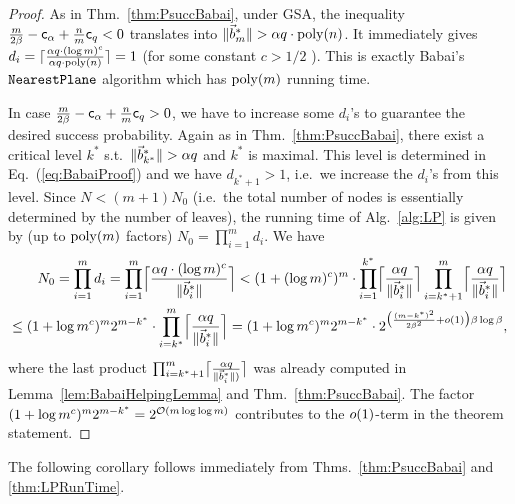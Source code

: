 \begin{proof}
	As in Thm.~\ref{thm:PsuccBabai}, under GSA, the inequality $\frac{m}{2 \beta} - \mathsf{c}_{\alpha} + \frac{n}{m}\mathsf{c}_q  < 0$ translates into $\| \vec b^*_m \| > \alpha q \cdot \mathrm{poly}(n)$. It immediately gives $d_i = \lceil \frac{\alpha q \cdot (\log m)^{c}}{ \alpha q \cdot \mathrm{poly}(n)} \rceil = 1$ (for some constant $c>1/2$ ). This is exactly Babai's $\texttt{NearestPlane}$ algorithm which has $\mathrm{poly}(m)$ running time.
	
	In case $\frac{m}{2 \beta} - \mathsf{c}_{\alpha} + \frac{n}{m}\mathsf{c}_q  > 0$, we have to increase some $d_i$'s to guarantee the desired success probability. Again as in Thm.~\ref{thm:PsuccBabai}, there exist a critical level $k^*$ s.t.\ $\| \vec b^*_{k^*}\| > \alpha q$ and $k^*$ is maximal. This level is determined in Eq.~(\ref{eq:BabaiProof}) and we have $d_{k^{*}+1}>1$, i.e.\ we increase the $d_i$'s from this level. Since $N < (m+1) N_0$ (i.e.\ the total number of nodes is essentially determined by the number of leaves), the running time of Alg.~\ref{alg:LP} is given by (up to $\mathrm{poly}(m)$ factors) $N_0 = \prod_{i=1}^m d_i$. We have
	\begin{align*}
		N_0 = \prod_{i=1}^m d_i = 
		\prod_{i=1}^m \Bigl\lceil \frac{\alpha q \cdot (\log m)^{c}}{ \| \vec b^*_i \|} \Bigr\rceil < 
		(1+(\log m)^c)^m \cdot \prod_{i=1}^{k^*} \Bigl\lceil \frac{\alpha q}{ \| \vec b^*_i \|} \Bigr\rceil \prod_{i=k^*+1}^{m} \Bigl\lceil \frac{\alpha q}{ \| \vec b^*_i \|} \Bigr\rceil \\
	\leq (1+\log{m}^c)^m 2^{m-k^*} \cdot \prod_{i=k^*}^{m} \Bigl\lceil \frac{\alpha q}{ \| \vec b^*_i \|} \Bigr\rceil =
	(1+\log{m}^c)^m 2^{m-k^*} \cdot 2^{\bigl( \frac{(m-k^*)^2}{2 \beta^2} +o(1) \bigr) \beta \log \beta},
	\end{align*} 
where the last product $\prod_{i=k^*+1}^{m} \bigl\lceil \frac{\alpha q}{ \| \vec b^*_i \|)} \bigr\rceil$ was already computed in Lemma~\ref{lem:BabaiHelpingLemma} and Thm.~\ref{thm:PsuccBabai}. The factor $(1+\log{m}^c)^m 2^{m-k^*} = 2^{\mathcal{O}(m \log \log m)}$ contributes to the $o(1)$-term in the theorem statement.
\end{proof}
The following corollary follows immediately from Thms.~\ref{thm:PsuccBabai} and \ref{thm:LPRunTime}.

